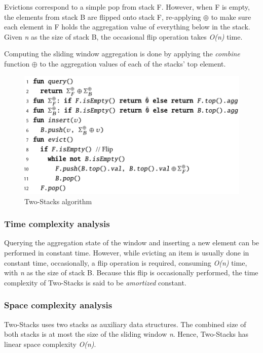 Evictions correspond to a simple pop from stack F. However, when F is empty, the elements from stack B are flipped onto stack F, re-applying $\oplus$ to make sure each element in F holds the aggregation value of everything below in the stack. Given \textit{n} as the size of stack B, the occasional flip operation takes \textit{O(n)} time.

Computing the sliding window aggregation is done by applying the \textit{combine} function $\oplus$ to the aggregation values of each of the stacks' top element. 

\begin{figure}[!htb]
    \begin{center}
      \includegraphics[scale=0.45]{figures/2-stacks.png}
      \caption{Two-Stacks algorithm}
      \label{fig:pseudo-2-stacks}
    \end{center}
\end{figure}

\subsubsection*{Time complexity analysis}
Querying the aggregation state of the window and inserting a new element can be performed in constant time. However, while evicting an item is usually done in constant time, occasionally, a flip operation is required, consuming \textit{O(n)} time, with \textit{n} as the size of stack B. Because this flip is occasionally performed, the time complexity of Two-Stacks is said to be \textit{amortized} constant.

\subsubsection*{Space complexity analysis}
Two-Stacks uses two stacks as auxiliary data structures. The combined size of both stacks is at most the size of the sliding window \textit{n}. Hence, Two-Stacks has linear space complexity \textit{O(n)}.

